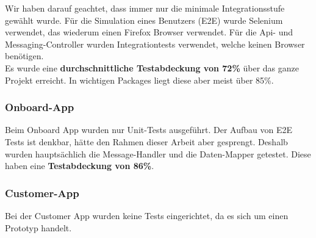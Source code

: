 Wir haben darauf geachtet, dass immer nur die minimale Integrationsstufe gewählt wurde. Für die Simulation eines Benutzers (E2E) wurde Selenium verwendet, das wiederum einen Firefox Browser verwendet. Für die Api- und Messaging-Controller wurden Integrationtests verwendet, welche keinen Browser benötigen.\\

Es wurde eine \textbf{durchschnittliche Testabdeckung von 72\%} über das ganze Projekt erreicht. In wichtigen Packages liegt diese aber meist über 85\%.

\subsubsection{Onboard-App}

Beim Onboard App wurden nur Unit-Tests ausgeführt. Der Aufbau von E2E Tests ist denkbar, hätte den Rahmen dieser Arbeit aber gesprengt. Deshalb wurden hauptsächlich die Message-Handler und die Daten-Mapper getestet. Diese haben eine \textbf{Testabdeckung von 86\%}.

\subsubsection{Customer-App}

Bei der Customer App wurden keine Tests eingerichtet, da es sich um einen Prototyp handelt.


